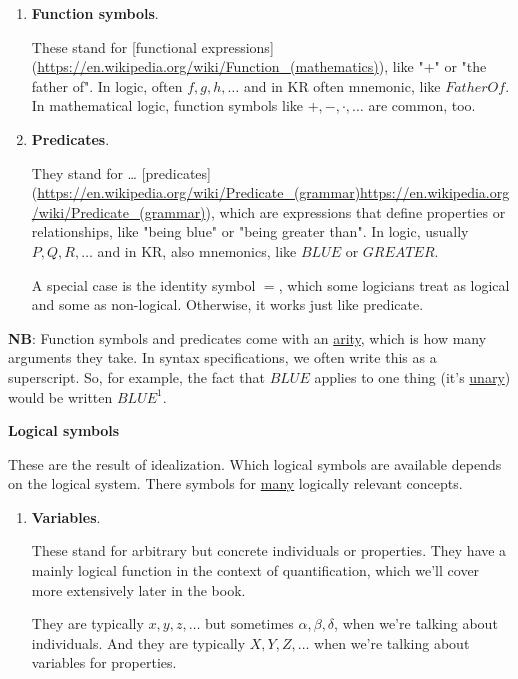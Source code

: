 \documentclass[11pt]{article}
\begin{document}
\begin{enumerate}
\item \textbf{\textbf{Function symbols}}. 

These stand for [functional
expressions](\url{https://en.wikipedia.org/wiki/Function\_(mathematics)}), like "+"
or "the father of". In logic, often \(f,g,h,\dots\) and in KR often mnemonic,
like \(FatherOf\). In mathematical logic, function symbols like \(+,-,\cdot,
    \dots\) are common, too.

\item \textbf{\textbf{Predicates}}. 

They stand for \ldots{}
[predicates](\url{https://en.wikipedia.org/wiki/Predicate\_(grammar)https://en.wikipedia.org/wiki/Predicate\_(grammar)}),
which are expressions that define properties or relationships, like "being
blue" or "being greater than". In logic, usually \(P,Q,R,\dots\) and in KR,
also mnemonics, like \(BLUE\) or \(GREATER\).

A special case is the identity symbol \(=\), which some logicians treat as
logical and some as non-logical. Otherwise, it works just like predicate.
\end{enumerate}

\textbf{\textbf{NB}}: Function symbols and predicates come with an \uline{arity}, which is how many
arguments they take. In syntax specifications, we often write this as a
superscript. So, for example, the fact that \(BLUE\) applies to one thing (it's
\uline{unary}) would be written \(BLUE^1\). 

\textbf{\textbf{Logical symbols}}

These are the result of idealization. Which logical symbols are available
depends on the logical system. There symbols for \uline{many} logically relevant
concepts.

\begin{enumerate}
\item \textbf{\textbf{Variables}}.

These stand for arbitrary but concrete individuals or properties. They have
a mainly logical function in the context of quantification, which we'll
cover more extensively later in the book.

They are typically \(x,y,z,\dots\) but sometimes \(\alpha,\beta,\delta\), when
we're talking about individuals. And they are typically \(X,Y,Z,\dots\) when
we're talking about variables for properties.
\end{enumerate}
\end{document}
